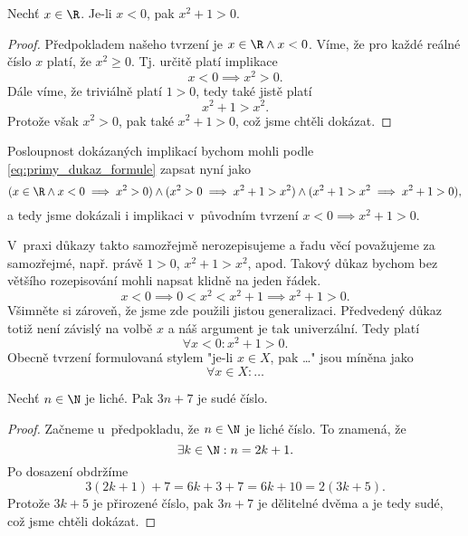 \begin{proposition}
    Nechť $x\in\R$. Je-li $x<0$, pak $x^2+1>0$.
\end{proposition}
\begin{proof}
    Předpokladem našeho tvrzení je $x\in\R \land x<0$. Víme, že pro každé reálné číslo $x$ platí, že $x^2\geq 0$. Tj. určitě platí implikace
    \begin{equation*}
        x<0 \implies x^2>0.
    \end{equation*}
    Dále víme, že triviálně platí $1>0$, tedy také jistě platí
    \begin{equation*}
        x^2+1>x^2.
    \end{equation*}
    Protože však $x^2>0$, pak také
    $x^2+1>0$, což jsme chtěli dokázat.
\end{proof}
Posloupnost dokázaných implikací bychom mohli podle \eqref{eq:primy_dukaz_formule} zapsat nyní jako
\begin{equation*}
    (x\in\R \land x<0 \implies x^2>0) \land (x^2>0 \implies x^2+1>x^2) \land (x^2+1>x^2 \implies x^2+1>0),
\end{equation*}
a tedy jsme dokázali i implikaci v~původním tvrzení $x<0 \implies x^2+1>0$.\par
V~praxi důkazy takto samozřejmě nerozepisujeme a řadu věcí považujeme za samozřejmé, např. právě $1>0$, $x^2+1>x^2$, apod. Takový důkaz bychom bez většího rozepisování mohli napsat klidně na jeden řádek.
\begin{equation*}
    x<0 \implies 0<x^2<x^2+1 \implies x^2+1>0.
\end{equation*}
Všimněte si zároveň, že jsme zde použili jistou generalizaci. Předvedený důkaz totiž není závislý na volbě $x$ a náš argument je tak univerzální. Tedy platí
\begin{equation*}
    \forall x<0: x^2+1>0.
\end{equation*}
Obecně tvrzení formulovaná stylem "je-li $x\in X$, pak \dots" jsou míněna jako
\begin{equation*}
    \forall x\in X: \dots
\end{equation*}
\begin{proposition}
    Nechť $n\in\N$ je liché. Pak $3n+7$ je sudé číslo.
\end{proposition}
\begin{proof}
    Začneme u~předpokladu, že $n\in\N$ je liché číslo. To znamená, že
    \begin{equation*}
        \exists k\in\N : n=2k+1.
    \end{equation*}
    Po dosazení obdržíme
    \begin{equation*}
        3(2k+1)+7=6k+3+7=6k+10=2(3k+5).
    \end{equation*}
    Protože $3k+5$ je přirozené číslo, pak $3n+7$ je dělitelné dvěma a je tedy sudé, což jsme chtěli dokázat.
\end{proof}
